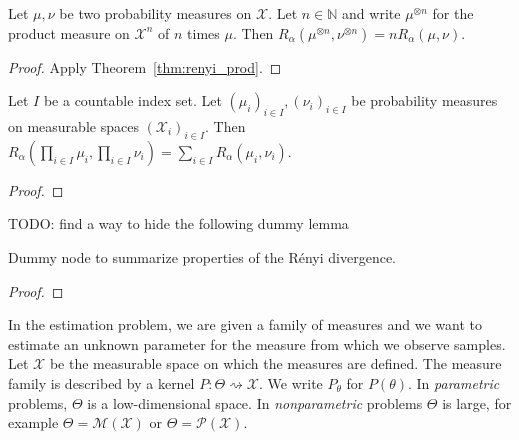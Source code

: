 \begin{corollary}
  \label{lem:renyi_prod_n}
  Let $\mu, \nu$ be two probability measures on $\mathcal X$. Let $n \in \mathbb{N}$ and write $\mu^{\otimes n}$ for the product measure on $\mathcal X^n$ of $n$ times $\mu$.
  Then $R_\alpha(\mu^{\otimes n}, \nu^{\otimes n}) = n R_\alpha(\mu, \nu)$.
\end{corollary}

\begin{proof}%
{}
Apply Theorem~\ref{thm:renyi_prod}.
\end{proof}


\begin{theorem}
  \label{thm:renyi_prod_countable}
  Let $I$ be a countable index set. Let $(\mu_i)_{i \in I}, (\nu_i)_{i \in I}$ be probability measures on measurable spaces $(\mathcal X_i)_{i \in I}$.
  Then $R_\alpha (\prod_{i \in I} \mu_i, \prod_{i \in I} \nu_i) = \sum_{i \in I} R_\alpha(\mu_i, \nu_i)$.
\end{theorem}

\begin{proof}%
{}
\end{proof}


TODO: find a way to hide the following dummy lemma
\begin{lemma}
  \label{lem:renyi_properties}
  \leanok
  Dummy node to summarize properties of the Rényi divergence.
\end{lemma}

\begin{proof}\leanok
{}
\end{proof}


In the estimation problem, we are given a family of measures and we want to estimate an unknown parameter for the measure from which we observe samples.
Let $\mathcal X$ be the measurable space on which the measures are defined.
The measure family is described by a kernel $P : \Theta \rightsquigarrow \mathcal X$. We write $P_\theta$ for $P(\theta)$.
In \emph{parametric} problems, $\Theta$ is a low-dimensional space. In \emph{nonparametric} problems $\Theta$ is large, for example $\Theta = \mathcal M (\mathcal X)$ or $\Theta = \mathcal P(\mathcal X)$.

